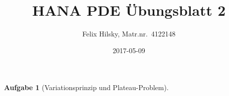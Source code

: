 \documentclass{scrartcl}
\author{Felix Hilsky, Matr.nr.\ 4122148}
\title{HANA PDE Übungsblatt 2}
\date{2017-05-09}
\newtheorem {problem} {Aufgabe}
\theoremstyle{remark}
\begin{document}
  \maketitle

  \begin{problem}[Variationsprinzip und Plateau-Problem]
    


\end{problem}
\end{document}
